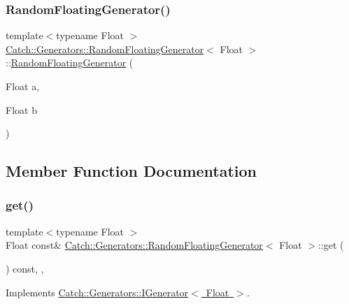 \subsubsection{\texorpdfstring{Random\+Floating\+Generator()}{RandomFloatingGenerator()}}
{\footnotesize\ttfamily template$<$typename Float $>$ \\
\mbox{\hyperlink{class_catch_1_1_generators_1_1_random_floating_generator}{Catch\+::\+Generators\+::\+Random\+Floating\+Generator}}$<$ Float $>$\+::\mbox{\hyperlink{class_catch_1_1_generators_1_1_random_floating_generator}{Random\+Floating\+Generator}} (\begin{DoxyParamCaption}\item[{Float}]{a,  }\item[{Float}]{b }\end{DoxyParamCaption})\hspace{0.3cm}{\ttfamily [inline]}}



\subsection{Member Function Documentation}
\mbox{\label{class_catch_1_1_generators_1_1_random_floating_generator_a0dea6fa1f9e2647df022f0b588cf0a8f}} 
\subsubsection{\texorpdfstring{get()}{get()}}
{\footnotesize\ttfamily template$<$typename Float $>$ \\
Float const\& \mbox{\hyperlink{class_catch_1_1_generators_1_1_random_floating_generator}{Catch\+::\+Generators\+::\+Random\+Floating\+Generator}}$<$ Float $>$\+::get (\begin{DoxyParamCaption}{ }\end{DoxyParamCaption}) const\hspace{0.3cm}{\ttfamily [inline]}, {\ttfamily [override]}, {\ttfamily [virtual]}}



Implements \mbox{\hyperlink{struct_catch_1_1_generators_1_1_i_generator_a525d381fc9249a885b075a0632a8579a}{Catch\+::\+Generators\+::\+I\+Generator$<$ Float $>$}}.

